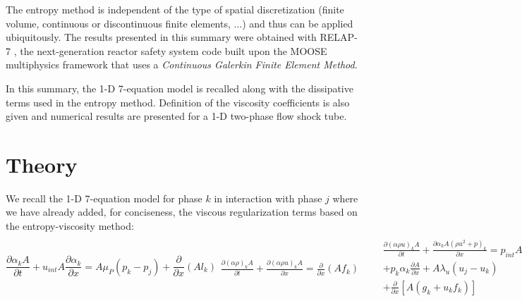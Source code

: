 \documentclass{anstrans}
\begin{document}
The entropy method is independent of the type of spatial discretization (finite volume,
continuous or discontinuous finite elements, ...) and thus can be applied ubiquitously. 
The results presented in this summary were obtained with RELAP-7 \cite{Berry_2014}, the next-generation 
reactor safety system code built upon the MOOSE multiphysics framework
\cite{moose} that uses a \emph{Continuous Galerkin Finite Element Method}.

In this summary, the 1-D 7-equation model is recalled along with the dissipative terms used 
in the entropy method. Definition of the viscosity coefficients is also given and numerical 
results are presented for a 1-D two-phase flow shock tube.
%
\section{Theory}
%
We recall the 1-D 7-equation model for phase $k$ in interaction with phase $j$ where we have already added, for conciseness, the viscous regularization
terms based on the entropy-viscosity method: %
\begin{subequations}
\label{eq:euler_visc}
%
\begin{equation}\label{eq:vf_eq}
  \frac{\partial \alpha_{k} A}{\partial t} + u_{int} A \frac{\partial \alpha_{k}}{\partial x}
  = A \mu_P (p_{k} - p_{j}) + \boxed{\frac{\partial }{\partial x} \left( A l_k  \right)}
\end{equation}
%
\begin{eqnarray}
  \frac{\partial \left( \alpha \rho \right)_{k} A}{\partial t}
  + \frac{\partial \left( \alpha \rho u \right)_{k} A}{\partial x}
  = \boxed{\frac{\partial }{\partial x} \left( A f_k \right)}
\end{eqnarray}
%
\begin{eqnarray}
 && \frac{\partial \left( \alpha \rho u \right)_{k} A}{\partial t}
  + \frac{\partial \alpha_{k} A \left( \rho u^2 + p \right)_{k} }{\partial x}   = p_{int} A \frac{\partial \alpha_{k}}{\partial x} \nonumber \\
 &&+ p_{k} \alpha_{k} \frac{\partial A}{\partial x}
  + A \lambda_u (u_{j} - u_{k}) \nonumber \\
 && + \boxed{\frac{\partial }{\partial x} \left[ A \left( g_k + u_k f_k \right) \right] }
\end{eqnarray}
%
\begin{eqnarray}
 &&\frac{\partial \left( \alpha \rho E \right)_{k} A}{\partial t}
  + \frac{\partial \alpha_{k} u_{k} A \left( \rho E + p \right)_{k}}{\partial x}
  = p_{int} u_{int} A \frac{\partial \alpha_{k}}{\partial x} 
  \nonumber \\
  &&- \bar{p}_{int} A \mu_P (p_{k} - p_{j})+ \bar{u}_{int} A \lambda_u (u_{j} - u_{k})
  \nonumber \\
 && + \boxed{\frac{\partial }{\partial x} \left[ A \left( h_k + u_k g_k - \frac{u_k^2}{2}f_k + \rho_k e_k l_k\right) \right] }
\end{eqnarray}
%
\end{subequations}
\end{document}
